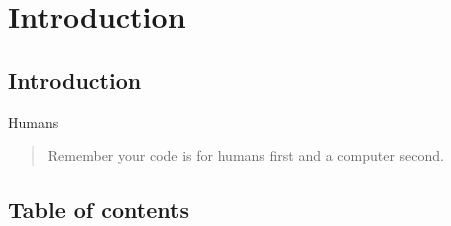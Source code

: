 %
%

\section{Introduction}

\subsection{Introduction}
\begin{FrameWithSubSection}
    \begin{block}{Humans}
        \begin{quote}
            Remember your code is for humans first and a computer second.
        \end{quote}
    \end{block}
\end{FrameWithSubSection}

\subsection{Table of contents}
